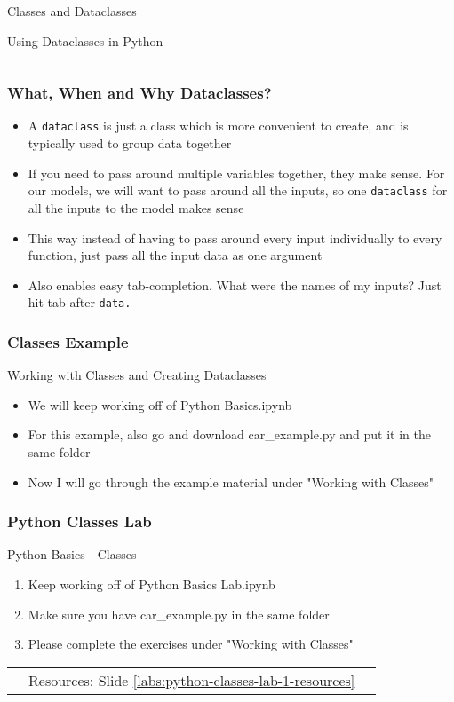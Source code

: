 \documentclass[handout, 11pt]{beamer}
\begin{document}
\begin{section}[Classes]{Classes and Dataclasses}
\begin{frame}[fragile]
\begin{block}{Using Dataclasses in Python}
\begin{verbatim}
\end{verbatim}
\end{block}
\end{frame}
\begin{frame}
\frametitle{What, When and Why Dataclasses?}
\begin{itemize}
\item A
\texttt{dataclass}
is just a class which is more convenient to create, and
is typically used to group data together
\vfill
\item If you need to pass around multiple variables together, they make sense. For our models, we will want to pass around all the inputs, so one
\texttt{dataclass}
for all the
inputs to the model makes sense
\vfill
\item This way instead of having to pass around every input individually to every function, just pass all the input data as one argument
\vfill
\item Also enables easy tab-completion. What were the names of my inputs? Just hit tab after
\texttt{data.}
\end{itemize}
\end{frame}
\begin{frame}
\frametitle{Classes Example}
{
\begin{block}{Working with Classes and Creating Dataclasses}
\begin{itemize}
\item We will keep working off of Python Basics.ipynb
\item For this example, also go and download car\_example.py and put it in the same folder
\item Now I will go through the example material under "Working with Classes"
\end{itemize}
\end{block}
}
\end{frame}
\begin{frame}
\frametitle{Python Classes Lab}
{
\begin{block}{Python Basics - Classes}
\begin{enumerate}
\item Keep working off of Python Basics Lab.ipynb
\item Make sure you have car\_example.py in the same folder
\item Please complete the exercises under "Working with Classes"
\end{enumerate}
\vfill
\begin{tabular*}{\textwidth}{@{\extracolsep{\fill}}ccc}
\toprule
\hfill & Resources: Slide \textcolor{blue}{\underline{\ref{labs:python-classes-lab-1-resources}}} & \hfill\\

\end{tabular*}
\end{block}
}
\label{labs:python-classes-lab-1}
\end{frame}
\end{section}
\end{document}
